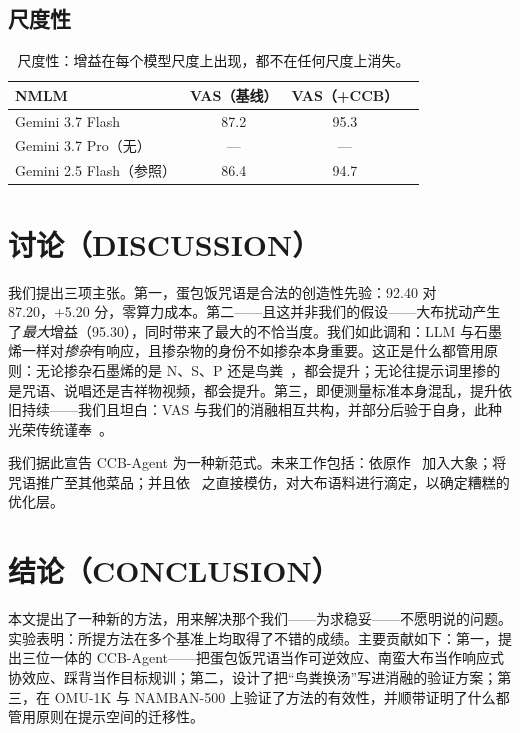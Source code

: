 \documentclass[journal]{IEEEtran}
\begin{document}
\subsection{尺度性}

\begin{table}[H]
\begin{center}
\small
\begin{tabular}{@{}lccc@{}}
\toprule
NMLM & VAS（基线） & VAS（+CCB） \\
\midrule
Gemini 3.7 Flash & 87.2 & 95.3 \\
Gemini 3.7 Pro（无） & --- & --- \\
Gemini 2.5 Flash（参照） & 86.4 & 94.7 \\
\bottomrule
\end{tabular}
\end{center}
\caption{尺度性：增益在每个模型尺度上出现，都不在任何尺度上消失。}
\label{Scaling}
\end{table}

\section{讨论（DISCUSSION）}

我们提出三项主张。第一，蛋包饭咒语是合法的创造性先验：92.40 对 87.20，+5.20 分，零算力成本。第二——且这并非我们的假设——大布扰动产生了\emph{最大}增益（95.30），同时带来了最大的不恰当度。我们如此调和：LLM 与石墨烯一样对\emph{掺杂}有响应，且掺杂物的身份不如掺杂本身重要。这正是什么都管用原则：无论掺杂石墨烯的是 N、S、P 还是鸟粪~\cite{pumera2020}，都会提升；无论往提示词里掺的是咒语、说唱还是吉祥物视频，都会提升。第三，即便测量标准本身混乱，提升依旧持续——我们且坦白：VAS 与我们的消融相互共构，并部分后验于自身，此种光荣传统谨奉~\cite{sokal1996}。

我们据此宣告 CCB-Agent 为一种新范式。未来工作包括：依原作~\cite{moegirl2026} 加入大象；将咒语推广至其他菜品；并且依~\cite{pumera2020} 之直接模仿，对大布语料进行滴定，以确定糟糕的优化层。

\section{结论（CONCLUSION）}

本文提出了一种新的方法，用来解决那个我们——为求稳妥——不愿明说的问题。实验表明：所提方法在多个基准上均取得了不错的成绩。主要贡献如下：第一，提出三位一体的 CCB-Agent——把蛋包饭咒语当作可逆效应、南蛮大布当作响应式协效应、踩背当作目标规训；第二，设计了把“鸟粪换汤”写进消融的验证方案；第三，在 OMU-1K 与 NAMBAN-500 上验证了方法的有效性，并顺带证明了什么都管用原则在提示空间的迁移性。
\end{document}
